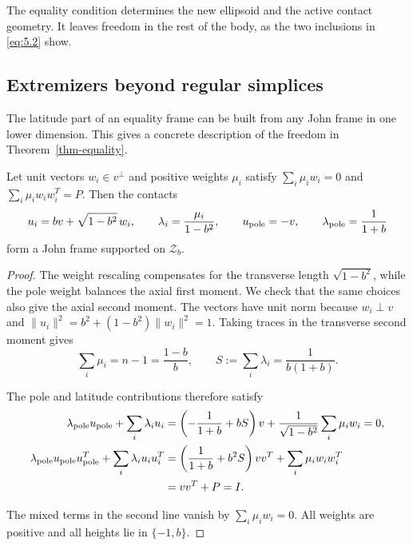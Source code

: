 The equality condition determines the new ellipsoid and the active contact geometry. It leaves freedom in the rest of the body, as the two inclusions in \eqref{eq:5.2} show.

\subsection{Extremizers beyond regular simplices}\label{sec:5.2}

The latitude part of an equality frame can be built from any John frame in one lower dimension. This gives a concrete description of the freedom in Theorem~\ref{thm-equality}.

\begin{proposition}\label{prop-extremizers}
Let unit vectors $w_i\in v^\perp$ and positive weights $\mu_i$ satisfy
$\sum_i\mu_iw_i=0$ and $\sum_i\mu_iw_iw_i^T=P$. Then the contacts
\begin{equation}\label{eq:5.7}
u_i=bv+\sqrt{1-b^2}\,w_i,\qquad
\lambda_i=\frac{\mu_i}{1-b^2},\qquad
u_{\rm pole}=-v,\qquad \lambda_{\rm pole}=\frac1{1+b}
\end{equation}
form a John frame supported on $\mathcal Z_b$.

\end{proposition}

\begin{proof}
The weight rescaling compensates for the transverse length
$\sqrt{1-b^2}$, while the pole weight balances the axial first moment.
We check that the same choices also give the axial second moment.
The vectors have unit norm because $w_i\perp v$ and
$\|u_i\|^2=b^2+(1-b^2)\|w_i\|^2=1$. Taking traces in the transverse second moment gives
\begin{equation}\label{eq:5.8}
\sum_i\mu_i=n-1=\frac{1-b}{b},\qquad
S:=\sum_i\lambda_i=\frac1{b(1+b)}.
\end{equation}

The pole and latitude contributions therefore satisfy
\begin{equation}\label{eq:5.9}
\begin{aligned}
\lambda_{\rm pole}u_{\rm pole}+\sum_i\lambda_i u_i
&=\left(-\frac1{1+b}+bS\right)v
+\frac1{\sqrt{1-b^2}}\sum_i\mu_iw_i=0,\\
\lambda_{\rm pole}u_{\rm pole}u_{\rm pole}^T+\sum_i\lambda_i u_i u_i^T
&=\left(\frac1{1+b}+b^2S\right)vv^T+\sum_i\mu_iw_iw_i^T\\
&=vv^T+P=I.
\end{aligned}
\end{equation}

The mixed terms in the second line vanish by $\sum_i\mu_iw_i=0$. All weights are positive and all heights lie in $\{-1,b\}$. 
\end{proof}

